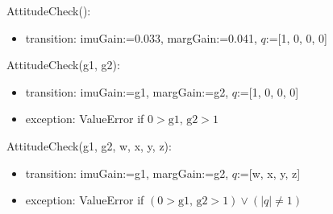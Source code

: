 \documentclass[12pt, titlepage]{article}
\begin{document}
\noindent AttitudeCheck():
\begin{itemize}
\item transition: imuGain:=0.033, margGain:=0.041, $q$:=[1, 0, 0, 0]
\end{itemize}

\noindent AttitudeCheck(g1, g2):
\begin{itemize}
\item transition: imuGain:=g1, margGain:=g2, $q$:=[1, 0, 0, 0]
\item exception: ValueError if $0 > \text{g1, g2} > 1$
\end{itemize}

\noindent AttitudeCheck(g1, g2, w, x, y, z):
\begin{itemize}
\item transition: imuGain:=g1, margGain:=g2, $q$:=[w, x, y, z]
\item exception: ValueError if $(0 > \text{g1, g2} > 1) \vee (|q| \neq 1)$
\end{itemize}
\end{document}
